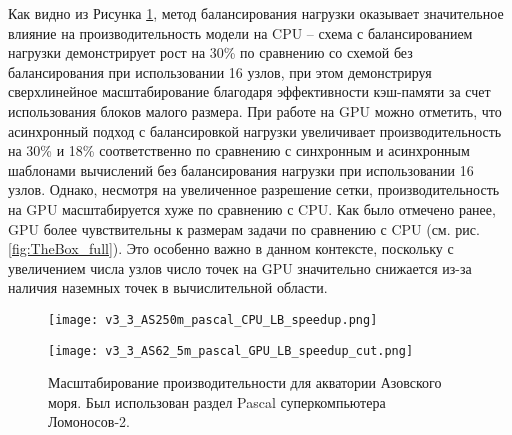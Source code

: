 Как видно из Рисунка \ref{fig:AzovSea}, метод балансирования нагрузки оказывает значительное влияние на производительность модели на CPU – схема с балансированием нагрузки демонстрирует рост на 30\% по сравнению со схемой без балансирования при использовании 16 узлов, при этом демонстрируя сверхлинейное масштабирование благодаря эффективности кэш-памяти за счет использования блоков малого размера.
При работе на GPU можно отметить, что асинхронный подход с балансировкой нагрузки увеличивает производительность на 30\% и 18\% соответственно по сравнению с синхронным и асинхронным шаблонами вычислений без балансирования нагрузки при использовании 16 узлов.
Однако, несмотря на увеличенное разрешение сетки, производительность на GPU масштабируется хуже по сравнению с CPU. Как было отмечено ранее, GPU более чувствительны к размерам задачи по сравнению с CPU (см. рис. \ref{fig:TheBox_full}).
Это особенно важно в данном контексте, поскольку с увеличением числа узлов число точек на GPU значительно снижается из-за наличия наземных точек в вычислительной области.

\begin{figure}[!ht]
	\begin{minipage}{0.5\linewidth}
	\centering
	\texttt{[image: v3\_3\_AS250m\_pascal\_CPU\_LB\_speedup.png]}
	\end{minipage}
	\begin{minipage}{0.5\linewidth}
	\centering
    \texttt{[image: v3\_3\_AS62\_5m\_pascal\_GPU\_LB\_speedup\_cut.png]}
	\end{minipage}
	\vspace{3pt}
	\caption{Масштабирование производительности для акватории Азовского моря. Был использован раздел Pascal суперкомпьютера Ломоносов-2.}
	\label{fig:AzovSea}
\end{figure}

\FloatBarrier
